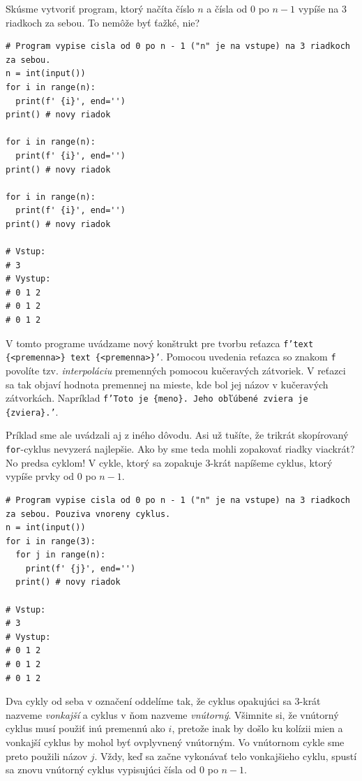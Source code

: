 \documentclass{article}
\begin{document}
Skúsme vytvoriť program, ktorý načíta číslo $n$ a čísla od $0$ po $n - 1$ vypíše na 3 riadkoch za sebou. To nemôže byť ťažké, nie?
\begin{lstlisting}
# Program vypise cisla od 0 po n - 1 ("n" je na vstupe) na 3 riadkoch za sebou.
n = int(input())
for i in range(n):
  print(f' {i}', end='')
print() # novy riadok

for i in range(n):
  print(f' {i}', end='')
print() # novy riadok

for i in range(n):
  print(f' {i}', end='')
print() # novy riadok

# Vstup:
# 3
# Vystup:
# 0 1 2
# 0 1 2
# 0 1 2
\end{lstlisting}
V tomto programe uvádzame nový konštrukt pre tvorbu reťazca \texttt{f'text \{<premenna>\} text \{<premenna>\}'}. Pomocou uvedenia reťazca so znakom \texttt{f} povolíte tzv. \textit{interpoláciu} premenných pomocou kučeravých zátvoriek. V reťazci sa tak objaví hodnota premennej na mieste, kde bol jej názov v kučeravých zátvorkách. Napríklad \texttt{f'Toto je \{meno\}. Jeho obľúbené zviera je \{zviera\}.'}.

Príklad sme ale uvádzali aj z iného dôvodu. Asi už tušíte, že trikrát skopírovaný \texttt{for}-cyklus nevyzerá najlepšie. Ako by sme teda mohli zopakovať riadky viackrát? No predsa cyklom! V cykle, ktorý sa zopakuje $3$-krát napíšeme cyklus, ktorý vypíše prvky od $0$ po $n - 1$.
\begin{lstlisting}
# Program vypise cisla od 0 po n - 1 ("n" je na vstupe) na 3 riadkoch za sebou. Pouziva vnoreny cyklus.
n = int(input())
for i in range(3):
  for j in range(n):
    print(f' {j}', end='')
  print() # novy riadok

# Vstup:
# 3
# Vystup:
# 0 1 2
# 0 1 2
# 0 1 2
\end{lstlisting}
Dva cykly od seba v označení oddelíme tak, že cyklus opakujúci sa $3$-krát nazveme \textit{vonkajší} a cyklus v ňom nazveme \textit{vnútorný}. Všimnite si, že vnútorný cyklus musí použiť inú premennú ako $i$, pretože inak by došlo ku kolízii mien a vonkajší cyklus by mohol byť ovplyvnený vnútorným. Vo vnútornom cykle sme preto použili názov $j$.
Vždy, keď sa začne vykonávať telo vonkajšieho cyklu, spustí sa znovu vnútorný cyklus vypisujúci čísla od $0$ po $n - 1$.
\end{document}
